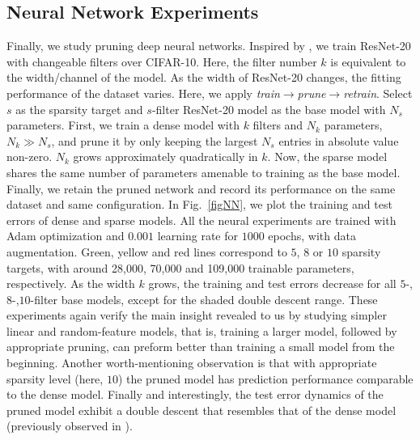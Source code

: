 \subsection{Neural Network Experiments}\label{ssec:NNE}
Finally, we study pruning deep neural networks.
Inspired by  \cite{nakkiran2019deep}, we train ResNet-20 with changeable filters over CIFAR-10. Here, the filter number $k$ is equivalent to the width/channel of the model. As the width of ResNet-20 changes, the fitting performance of the dataset varies. Here, we apply {\em{train$\rightarrow$prune$\rightarrow$retrain}}.
Select $s$ as the sparsity target and $s$-filter ResNet-20 model as the base model with $N_s$ parameters. First, we train a dense model with $k$ filters and $N_k$ parameters, $N_k\gg N_s$, and prune it by only keeping the largest $N_s$ entries in absolute value non-zero. $N_k$ grows approximately quadratically in $k$. Now, the sparse model shares the same number of parameters amenable to training as the base model. Finally, we retain the pruned network and record its performance on the same dataset and same configuration. 
In Fig.~\ref{figNN}, we plot the training and test errors of dense and sparse models. All the neural experiments are trained with Adam optimization and $0.001$ learning rate for $1000$ epochs, with data augmentation. Green, yellow and red lines correspond to $5$, $8$ or $10$ sparsity targets, with around 28,000, 70,000 and 109,000 trainable parameters, respectively. As the width $k$ grows, the training and test errors decrease for all $5$-,$8$-,$10$-filter base models, except for the shaded double descent range. These experiments again verify the main insight revealed to us by studying simpler linear and random-feature models, that is, training a larger model, followed by appropriate pruning, can preform better than training a small model from the beginning.
%
Another worth-mentioning observation is that with appropriate sparsity level (here, $10$) the pruned model has prediction performance comparable to the dense model. Finally and interestingly, the test error dynamics of the pruned model exhibit a double descent that resembles that of the dense model (previously observed in \cite{nakkiran2019deep}). 




